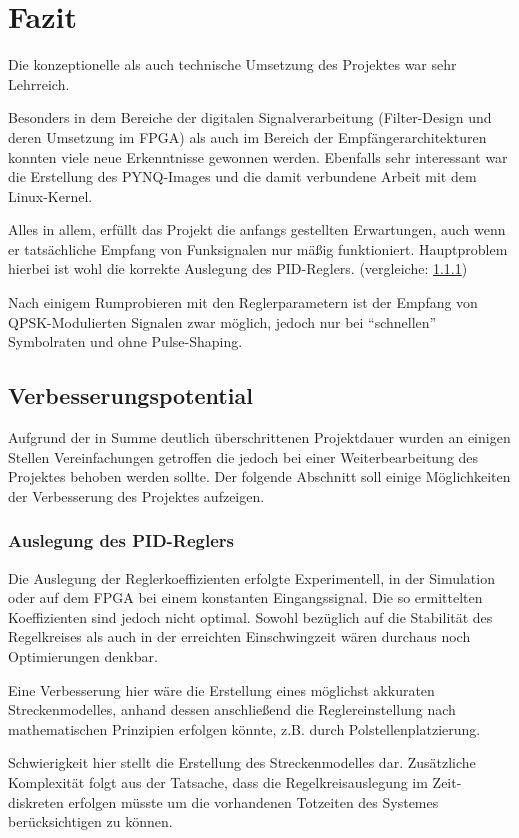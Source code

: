 \chapter{Fazit}
Die konzeptionelle als auch technische Umsetzung des Projektes war sehr Lehrreich.

Besonders in dem Bereiche der digitalen Signalverarbeitung (Filter-Design und deren Umsetzung im \acs{FPGA}) als auch im Bereich der Empfängerarchitekturen 
konnten viele neue Erkenntnisse gewonnen werden.
Ebenfalls sehr interessant war die Erstellung des \acs{PYNQ}-Images und die damit verbundene Arbeit mit dem Linux-Kernel.

Alles in allem, erfüllt das Projekt die anfangs gestellten Erwartungen, auch wenn er tatsächliche Empfang von Funksignalen nur mäßig funktioniert.
Hauptproblem hierbei ist wohl die korrekte Auslegung des \acs{PID}-Reglers. (vergleiche: \ref{Sec:PID_opt})

Nach einigem Rumprobieren mit den Reglerparametern ist der Empfang von \acs{QPSK}-Modulierten Signalen zwar möglich, jedoch nur bei \enquote{schnellen} Symbolraten und ohne Pulse-Shaping.

\section{Verbesserungspotential}
Aufgrund der in Summe deutlich überschrittenen Projektdauer wurden an einigen Stellen Vereinfachungen getroffen die jedoch bei einer Weiterbearbeitung des Projektes
behoben werden sollte. Der folgende Abschnitt soll einige Möglichkeiten der Verbesserung des Projektes aufzeigen.

\subsection{Auslegung des PID-Reglers} \label{Sec:PID_opt}
Die Auslegung der Reglerkoeffizienten erfolgte Experimentell, in der Simulation oder auf dem \acs{FPGA} bei einem konstanten Eingangssignal.
Die so ermittelten Koeffizienten sind jedoch nicht optimal. 
Sowohl bezüglich auf die Stabilität des Regelkreises als auch in der erreichten Einschwingzeit wären durchaus noch Optimierungen denkbar. 

Eine Verbesserung hier wäre die Erstellung eines möglichst akkuraten Streckenmodelles, anhand dessen anschließend die Reglereinstellung
nach mathematischen Prinzipien erfolgen könnte, z.B. durch Polstellenplatzierung.

Schwierigkeit hier stellt die Erstellung des Streckenmodelles dar.
Zusätzliche Komplexität folgt aus der Tatsache, dass die Regelkreisauslegung im Zeit-diskreten erfolgen müsste um die vorhandenen Totzeiten des Systemes berücksichtigen zu können.

